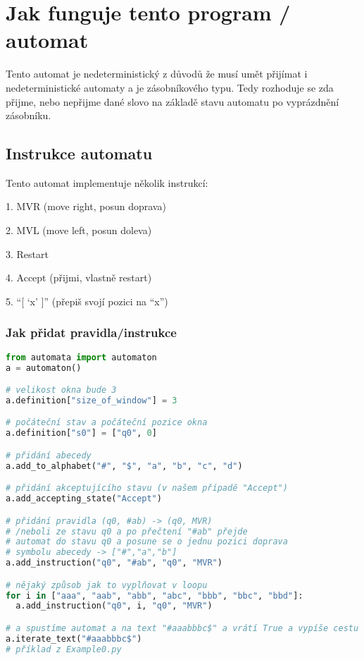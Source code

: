 \documentclass{article}
\begin{document}
\section{Jak funguje tento program / automat}

Tento automat je nedeterministický z důvodů že musí umět přijímat i nedeterministické automaty a je zásobníkového typu. Tedy rozhoduje se zda přijme, nebo nepřijme dané slovo na základě stavu automatu po vyprázdnění zásobníku.

\subsection{Instrukce automatu}

Tento automat implementuje několik instrukcí:

1.  MVR (move right, posun doprava)

2.  MVL (move left, posun doleva)

3.  Restart

4.  Accept (přijmi, vlastně restart)

5.  “[ ‘x’ ]” (přepiš svojí pozici na “x”)


\subsubsection{Jak přidat pravidla/instrukce}

\begin{lstlisting}[language=Python, caption=Příklad použití]
from automata import automaton
a = automaton()

# velikost okna bude 3
a.definition["size_of_window"] = 3

# počáteční stav a počáteční pozice okna
a.definition["s0"] = ["q0", 0]

# přidání abecedy
a.add_to_alphabet("#", "$", "a", "b", "c", "d")

# přidání akceptujícího stavu (v našem případě "Accept")
a.add_accepting_state("Accept")

# přidání pravidla (q0, #ab) -> (q0, MVR)
# /neboli ze stavu q0 a po přečtení "#ab" přejde
# automat do stavu q0 a posune se o jednu pozici doprava
# symbolu abecedy -> ["#","a","b"]
a.add_instruction("q0", "#ab", "q0", "MVR")

# nějaký způsob jak to vyplňovat v loopu
for i in ["aaa", "aab", "abb", "abc", "bbb", "bbc", "bbd"]:
  a.add_instruction("q0", i, "q0", "MVR")

# a spustíme automat a na text "#aaabbbc$" a vrátí True a vypíše cestu s barevně označeým oknem
a.iterate_text("#aaabbbc$")
# příklad z Example0.py
\end{lstlisting}
\end{document}
